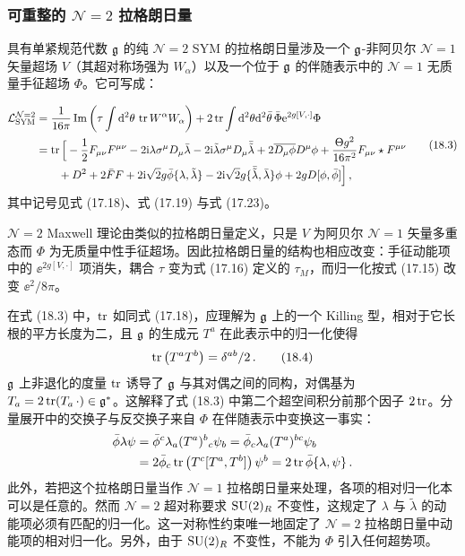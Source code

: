 \subsubsection*{可重整的 $\mathcal N=2$ 拉格朗日量}

\begin{proposition}[18.2]
具有单紧规范代数 $\mathfrak{g}$ 的纯 $\mathcal N=2$ SYM 的拉格朗日量涉及一个 $\mathfrak{g}$-非阿贝尔 $\mathcal N=1$ 矢量超场 $V$（其超对称场强为 $W_\alpha$）以及一个位于 $\mathfrak{g}$ 的伴随表示中的 $\mathcal N=1$ 无质量手征超场 $\Phi$。它可写成：
\end{proposition}

\begin{equation}
\begin{aligned}
\mathcal L^{\mathcal N=2}_{\mathrm{SYM}}
&=\frac{1}{16\pi}\operatorname{Im}\left(\tau\int\mathrm{d}^2\theta\,\operatorname{tr} W^\alpha W_\alpha\right)
+2\operatorname{tr}\int\mathrm{d}^2\theta\mathrm{d}^2\bar\theta\,\bar\Phi \mathrm{e}^{2g[V,\cdot]}\Phi\\
&=\operatorname{tr}\Big[-\frac{1}{2}F_{\mu\nu}F^{\mu\nu}-2\mathrm{i}\lambda\sigma^\mu D_\mu\bar\lambda
-2\mathrm{i}\tilde\lambda\sigma^\mu D_\mu\bar{\tilde\lambda}
+2\overline{D_\mu\phi}D^\mu\phi+\frac{\Theta g^2}{16\pi^2}F_{\mu\nu}\star F^{\mu\nu}\\
&\qquad+D^2+2\bar FF+2\mathrm{i}\sqrt{2}g\bar\phi\{\lambda,\tilde\lambda\}
-2\mathrm{i}\sqrt{2}g\{\bar{\tilde\lambda},\bar\lambda\}\phi+2gD[\phi,\bar\phi]\Big]\,,
\end{aligned}
\tag{18.3}
\end{equation}
其中记号见式 (17.18)、式 (17.19) 与式 (17.23)。

$\mathcal N=2$ Maxwell 理论由类似的拉格朗日量定义，只是 $V$ 为阿贝尔 $\mathcal N=1$ 矢量多重态而 $\Phi$ 为无质量中性手征超场。因此拉格朗日量的结构也相应改变：手征动能项中的 $\ee^{2g[V,\cdot]}$ 项消失，耦合 $\tau$ 变为式 (17.16) 定义的 $\tau_M$，而归一化按式 (17.15) 改变 $\ee^2/8\pi$。

在式 (18.3) 中，$\operatorname{tr}$ 如同式 (17.18)，应理解为 $\mathfrak{g}$ 上的一个 Killing 型，相对于它长根的平方长度为二，且 $\mathfrak{g}$ 的生成元 $T^a$ 在此表示中的归一化使得
\begin{equation}
\operatorname{tr}\left(T^aT^b\right)=\delta^{ab}/2\,. \tag{18.4}
\end{equation}
$\mathfrak{g}$ 上非退化的度量 $\operatorname{tr}$ 诱导了 $\mathfrak{g}$ 与其对偶之间的同构，对偶基为 $T_a=2\operatorname{tr}(T_a\,\cdot)\in\mathfrak{g}^*$。这解释了式 (18.3) 中第二个超空间积分前那个因子 $2\operatorname{tr}$。分量展开中的交换子与反交换子来自 $\Phi$ 在伴随表示中变换这一事实：
\[
\begin{aligned}
\bar\phi\lambda\psi&=\bar\phi^c\lambda_a(T^a)^b{}_c\psi_b=\bar\phi_c\lambda_a(T^a)^{bc}\psi_b\\
&=2\bar\phi_c\operatorname{tr}\left(T^c[T^a,T^b]\right)\psi^b=2\operatorname{tr}\bar\phi\{\lambda,\psi\}\,.
\end{aligned}
\]
此外，若把这个拉格朗日量当作 $\mathcal N=1$ 拉格朗日量来处理，各项的相对归一化本可以是任意的。然而 $\mathcal N=2$ 超对称要求 $\operatorname{SU}(2)_R$ 不变性，这规定了 $\lambda$ 与 $\tilde\lambda$ 的动能项必须有匹配的归一化。这一对称性约束唯一地固定了 $\mathcal N=2$ 拉格朗日量中动能项的相对归一化。另外，由于 $\operatorname{SU}(2)_R$ 不变性，不能为 $\Phi$ 引入任何超势项。


